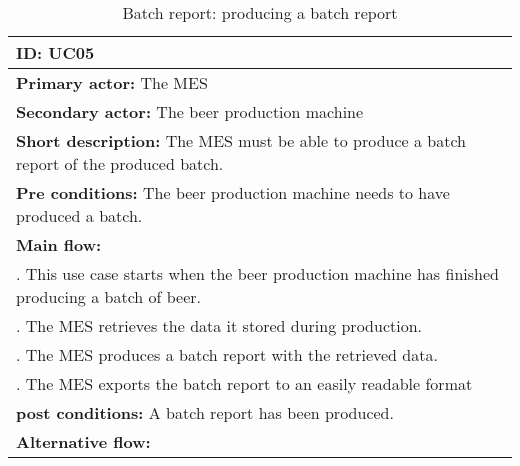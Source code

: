 \begin{table}[ht]
    \begin{tabularx}{\textwidth}{|>{\RaggedRight}X|}
        \hline
        \textbf{ID:} UC05  \\
        \hline
        \textbf{Primary actor:} The MES \\
        \hline
        \textbf{Secondary actor:} The beer production machine \\
        \hline
        \textbf{Short description:} The MES must be able to produce a batch
        report of the produced batch. \\
        \hline
        \textbf{Pre conditions:} The beer production machine needs to have
        produced a batch. \\
        \hline
        \textbf{Main flow:} \\
        	1. This use case starts when the beer production machine has
        	finished producing a batch of beer. \\
			2. The MES retrieves the data it stored during production. \\
			3. The MES produces a batch report with the retrieved data. \\
			4. The MES exports the batch report to an easily readable format \\
		\hline
        \textbf{post conditions:} A batch report has been produced. \\
        \hline
        \textbf{Alternative flow:} \\
        \hline
    \end{tabularx}
    \caption{Batch report: producing a batch report}
    \label{table:usecase_batchReport}
\end{table}

